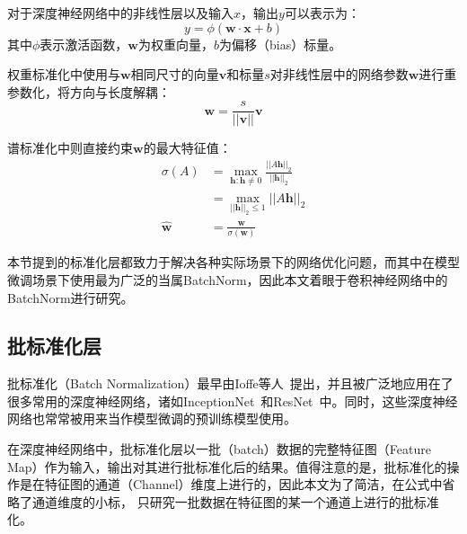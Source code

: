 \begin{definition}[权重标准化与谱标准化]
    对于深度神经网络中的非线性层以及输入$x$，输出$y$可以表示为：
    \begin{equation}
        y=\phi(\mathbf{w}\cdot \mathbf{x} + b)
    \end{equation}
    其中$\phi$表示激活函数，$\mathbf{w}$为权重向量，$b$为偏移（bias）标量。

    权重标准化中使用与$\mathbf{w}$相同尺寸的向量$\mathbf{v}$和标量$s$对非线性层中的网络参数$\mathbf{w}$进行重参数化，将方向与长度解耦：
    \begin{equation}
        \mathbf{w}=\frac{s}{\vert \vert \mathbf{v} \vert \vert} \mathbf{v}
    \end{equation}

    谱标准化中则直接约束$\mathbf{w}$的最大特征值：
    \begin{equation}
        \begin{aligned}
            \sigma(A) &= \mathop {\max} \limits_{ \symbf{h}:\symbf{h} \neq 0 } \frac{\vert\vert A\symbf{h} \vert\vert_2}{\vert\vert \symbf{h} \vert\vert_2} \\
                        &= \mathop {\max} \limits_{\vert\vert \symbf{h} \vert\vert_2 \leq 1 } \vert\vert A\symbf{h} \vert\vert_2\\
            \hat{\mathbf{w}} &= \frac{\mathbf{w}}{\sigma(\mathbf{w}) } 
        \end{aligned}
    \end{equation}
\end{definition}

本节提到的标准化层都致力于解决各种实际场景下的网络优化问题，而其中在模型微调场景下使用最为广泛的当属BatchNorm，因此本文着眼于卷积神经网络中的BatchNorm进行研究。

\subsection{批标准化层}
\label{section:bn}


批标准化（Batch Normalization）最早由Ioffe等人~\citep{ioffe2015BN}提出，并且被广泛地应用在了很多常用的深度神经网络，诸如InceptionNet~\citep{szegedy_going_2015}和ResNet~\citep{he2016deep}中。同时，这些深度神经
网络也常常被用来当作模型微调的预训练模型使用。

在深度神经网络中，批标准化层以一批（batch）数据的完整特征图（Feature Map）作为输入，输出对其进行批标准化后的结果。值得注意的是，批标准化的操作是在特征图的通道（Channel）维度上进行的，因此本文为了简洁，在公式中省略了通道维度的小标，
只研究一批数据在特征图的某一个通道上进行的批标准化。

